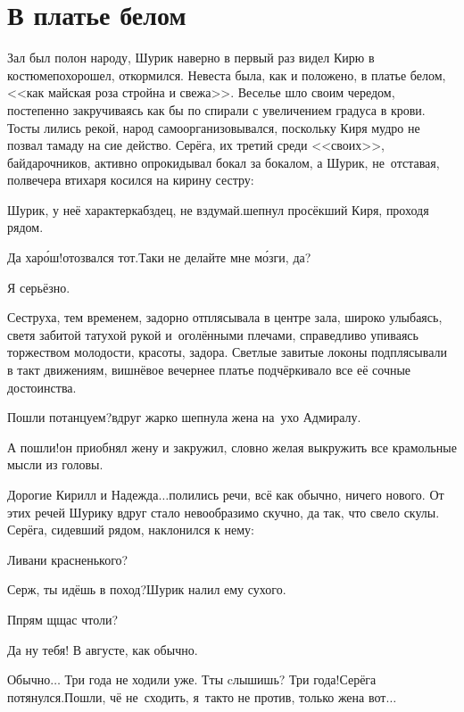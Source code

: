 {
\chapter{В платье белом}
\vepsianrose

\fancyhead[LE]{\fancyplain{}{\bfseries \parttitle}}
\fancyhead[RO]{\fancyplain{}{\bfseries \rightmark}}

Зал был полон народу, Шурик наверно в первый раз видел Кирю в костюме\mdash похорошел, откормился. Невеста была, как и положено, в платье белом, <<как майская роза стройна и свежа>>. Веселье шло своим чередом, постепенно закручиваясь как бы по спирали с увеличением градуса в крови. Тосты лились рекой, народ самоорганизовывался, поскольку Киря мудро не позвал тамаду на сие действо. Серёга, их третий среди <<своих>>, байдарочников, активно опрокидывал бокал за бокалом, а Шурик, не~отставая, полвечера втихаря косился на кирину сестру:

\diagdash Шурик, у неё характер\mdash кабздец, не вздумай.\mdash шепнул просёкший Киря, проходя рядом. 

\diagdash Да хар\'{о}ш!\mdash отозвался тот.\mdash Таки не делайте мне м\'{о}зги, да?

\diagdash Я серьёзно.

Сеструха, тем временем, задорно отплясывала в центре зала, широко улыбаясь, светя забитой татухой рукой и~оголёнными плечами, справедливо упиваясь торжеством молодости, красоты, задора. Светлые завитые локоны подплясывали в такт движениям, вишнёвое вечернее платье подчёркивало все её сочные достоинства.

\diagdash Пошли потанцуем?\mdash вдруг жарко шепнула жена на~ухо Адмиралу.

\diagdash А пошли!\mdash он приобнял жену и закружил, словно желая выкружить все крамольные мысли из головы. 

\diagdash Дорогие Кирилл и Надежда$\ldots$\mdash полились речи, всё как обычно, ничего нового. От этих речей Шурику вдруг стало невообразимо скучно, да так, что свело скулы. Серёга, сидевший рядом, наклонился к нему:

\diagdash Ливани красненького?

\diagdash Серж, ты идёшь в поход?\mdash Шурик налил ему сухого. 

\diagdash П\sdash прям щ\sdash щас чтоли?

\diagdash Да ну тебя! В августе, как обычно.

\diagdash Обычно$\ldots$ Три года не ходили уже. Т\sdash ты cлышишь? Три года!\mdash Серёга потянулся.\mdash Пошли, чё не~сходить, я~так\sdash то не против, только жена вот$\ldots$

}
